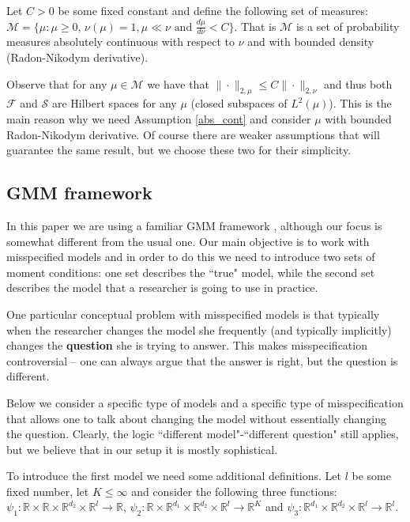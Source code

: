 \documentclass[12pt]{article}
\theoremstyle{plain}
\begin{document}
Let $C>0$ be some fixed constant and define the following set of measures: $\mathcal{M} = \{\mu: \mu\ge 0,\, \nu(\mu) = 1,\mu\ll \nu \text{ and $\frac{d\mu}{d\nu}<C$}\}$. That is $\mathcal{M}$ is a set of probability measures absolutely continuous with respect to $\nu$ and with bounded density (Radon-Nikodym derivative). 

Observe that for any $\mu\in \mathcal{M}$ we have that $\|\cdot\|_{2,\mu}\le C\|\cdot\|_{2,\nu}$ and thus both $\mathcal{F}$ and $\mathcal{S}$ are Hilbert spaces for any $\mu$ (closed subspaces of $L^2(\mu)$). This is the main reason why we need Assumption \ref{abs_cont} and consider $\mu$ with  bounded Radon-Nikodym derivative. Of course there are weaker assumptions that will guarantee the same result, but we choose these two for their simplicity. 


\subsection{GMM framework}

In this paper we are using a familiar GMM framework \parencite[see][]{hansen1982large}, although our focus is somewhat different from the usual one. Our main objective is to work with misspecified models and in order to do this we need to introduce two sets of moment conditions: one set describes the ``true" model, while the second set describes the model that a researcher is going to use in practice. 

One particular conceptual problem with misspecified models is that typically when the researcher changes the model she frequently (and typically implicitly) changes the \textbf{question} she is trying to answer. This makes misspecification controversial -- one can always argue that the answer is right, but the question is different.

 Below we consider a specific type of models and a specific type of misspecification that allows one to talk about changing the model without essentially changing the question. Clearly, the logic ``different model"-``different question" still applies, but we believe that in our setup it is mostly sophistical. 

To introduce the first model we need some additional definitions. Let $l$ be some fixed number, let $K\le \infty$ and consider the following three functions: $\psi_1: \mathbb{R}\times\mathbb{R}\times \mathbb{R}^{d_2}\times \mathbb{R}^l \rightarrow \mathbb{R}$, $\psi_2: \mathbb{R}\times\mathbb{R}^{d_1}\times \mathbb{R}^{d_2}\times \mathbb{R}^{l} \rightarrow \mathbb{R}^{K}$ and $\psi_3: \mathbb{R}^{d_1}\times\mathbb{R}^{d_2}\times \mathbb{R}^l \rightarrow \mathbb{R}^{l}$. 
\end{document}
